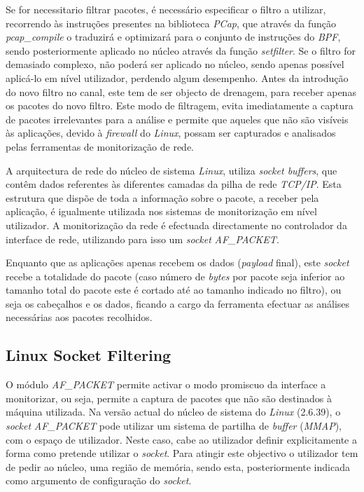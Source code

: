 Se for necessitario filtrar pacotes, é necessário especificar o filtro a utilizar, recorrendo às instruções presentes na biblioteca \textit{PCap}, que através da função  \textit{pcap\_compile} o traduzirá e optimizará para o conjunto de instruções do \textit{BPF}, sendo posteriormente aplicado no núcleo através da função \textit{setfilter}.
Se o filtro for demasiado complexo, não poderá ser aplicado no núcleo, sendo apenas possível aplicá-lo em nível utilizador, perdendo algum desempenho.
Antes da introdução do novo filtro no canal, este tem de ser objecto de drenagem, para receber apenas os pacotes do novo filtro.
Este modo de filtragem, evita imediatamente a captura de pacotes irrelevantes para a análise e permite que aqueles que não são visíveis às aplicações, devido à \textit{firewall} do \textit{Linux}, possam ser capturados e analisados pelas ferramentas de monitorização de rede.

A arquitectura de rede do núcleo de sistema \textit{Linux}, utiliza \textit{socket buffers}, que contêm dados referentes às diferentes camadas da pilha de rede \textit{TCP/IP}.
Esta estrutura que dispõe de toda a informação sobre o pacote, a receber pela aplicação, é igualmente utilizada nos sistemas de monitorização em nível utilizador.
A monitorização da rede é efectuada directamente no controlador da interface de rede, utilizando para isso um \textit{socket} \textit{AF\_PACKET}.

Enquanto que as aplicações apenas recebem os dados (\textit{payload} final), este \textit{socket} recebe a totalidade do pacote (caso número de \textit{bytes} por pacote seja inferior ao tamanho total do pacote este é cortado até ao tamanho indicado no filtro), ou seja os cabeçalhos e os dados, ficando a cargo da ferramenta efectuar as análises necessárias aos pacotes recolhidos.

\subsection{Linux Socket Filtering}



O módulo \textit{AF\_PACKET} permite activar o modo promiscuo da interface a monitorizar, ou seja, permite a captura de pacotes que não são destinados à máquina utilizada.
Na versão actual do núcleo de sistema do \textit{Linux} (2.6.39), o \textit{socket} \textit{AF\_PACKET} pode utilizar um sistema de partilha de \textit{buffer} (\textit{MMAP}), com o espaço de utilizador.
Neste caso, cabe ao utilizador definir explicitamente a forma como pretende utilizar o \textit{socket}. 
Para atingir este objectivo o utilizador tem de pedir ao núcleo, uma região de memória, sendo esta, posteriormente indicada como argumento de configuração do \textit{socket}.

